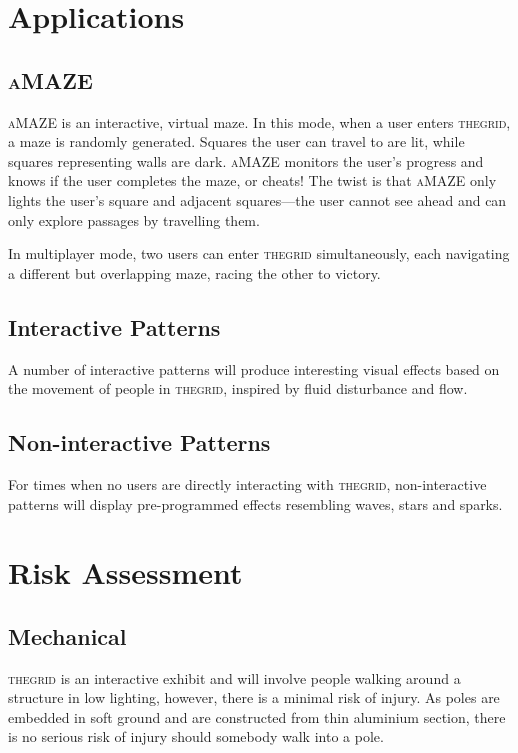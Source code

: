 \documentclass[12pt]{article} %
\newcommand{\thegrid}{\textsc{the\textperiodcentered grid}\xspace}
\newcommand{\amaze}{\textsc{aMAZE}\xspace}
\begin{document}
\section{Applications}
\subsection{\amaze}
\amaze is an interactive, virtual maze.  In this mode, when a user enters
\thegrid, a maze is randomly generated.  Squares the user can travel to are
lit, while squares representing walls are dark.  \amaze monitors the user's
progress and knows if the user completes the maze, or cheats!  The twist is
that \amaze only lights the user's square and adjacent squares---the user
cannot see ahead and can only explore passages by travelling them.

In multiplayer mode, two users can enter \thegrid simultaneously, each
navigating a different but overlapping maze, racing the other to victory.

\subsection{Interactive Patterns}
A number of interactive patterns will produce interesting visual effects based
on the movement of people in \thegrid, inspired by fluid disturbance and flow.

\subsection{Non-interactive Patterns}
For times when no users are directly interacting with \thegrid, non-interactive
patterns will display pre-programmed effects resembling waves, stars and
sparks.

\clearpage
\section{Risk Assessment}
\subsection{Mechanical}
\thegrid is an interactive exhibit and will involve people walking around a
structure in low lighting, however, there is a minimal risk of injury.  As
poles are embedded in soft ground and are constructed from thin aluminium
section, there is no serious risk of injury should somebody walk into a pole.
\end{document}
